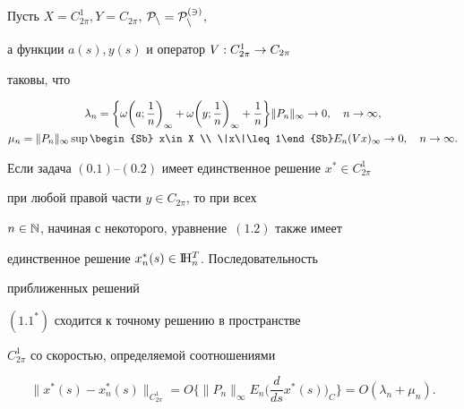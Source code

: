 \begin{thm}


Пусть $X=C_{2\pi}^1, Y=C_{2\pi}$, $\cal P_n=\cal P_n^{(3)}$,


а функции $a(s), y(s)$ и оператор $V : C_{2\pi}^1 \to C_{2\pi}$


таковы, что


\begin{gather}


\lambda_n=\bigg\{ \omega\bigg(a;\frac{1}{n}\bigg)_\infty +


\omega\bigg(y;\frac{1}{n}\bigg)_\infty + \frac{1}{n}\bigg\} 


\|P_n\|_{\infty }\rightarrow 0,


\quad n\rightarrow \infty , \\


%


\mu_n=\|P_n\|_{\infty } \sup\begin{Sb} x\in X \\ \|x\|\leq 1\end{Sb}


E_n(Vx)_{\infty }\rightarrow 0,\quad n\rightarrow\infty .


\end{gather}





Если задача $(0.1)$--$(0.2)$ имеет единственное решение $x^*\in C_{2\pi}^1$


при любой правой части $y\in C_{2\pi}$, то при всех


$n\in \Bbb N$, начиная с некоторого, уравнение~$(1.2)$ также имеет


единственное решение $x_n^*(s)\in \mathrm I \!\mathrm H_n^T$. Последовательность


приближенных решений


$(1.1^*)$ сходится к точному решению в пространстве


$C_{2\pi}^1$ со скоростью, определяемой соотношениями


\begin{equation}


\|x^*(s)-x_n^*(s)\|_{C_{2\pi}^1}= O\bigg\{ \|P_n\|_{\infty }E_n


\bigg( \frac{d}{ds}x^*(s)\bigg)_C\bigg\} =


O (\lambda_n+\mu_n).


\end{equation}


\end{thm}





